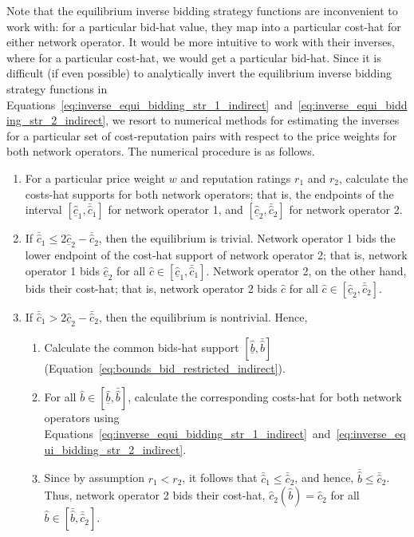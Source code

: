 Note that the equilibrium inverse bidding strategy functions are inconvenient to work with: for a particular bid-hat value, they map into a particular cost-hat for either network operator. It would be more intuitive to work with their inverses, where for a particular cost-hat, we would get a particular bid-hat. Since it is difficult (if even possible) to analytically invert the equilibrium inverse bidding strategy functions in Equations~\eqref{eq:inverse_equi_bidding_str_1_indirect}~and~\eqref{eq:inverse_equi_bidding_str_2_indirect}, we resort to numerical methods for estimating the inverses for a particular set of cost-reputation pairs with respect to the price weights for both network operators. The numerical procedure is as follows.
\begin{enumerate}
  \item For a particular price weight $w$ and reputation ratings $r_1$ and $r_2$, calculate the costs-hat supports for both network operators; that is, the endpoints of the interval $[\underline{\hat{c}}_1, \bar{\hat{c}}_1]$ for network operator 1, and $[\underline{\hat{c}}_2, \bar{\hat{c}}_2]$ for network operator 2.
  \item If $\bar{\hat{c}}_1 \le 2\underline{\hat{c}}_2 - \bar{\hat{c}}_2$, then the equilibrium is trivial. Network operator 1 bids the lower endpoint of the cost-hat support of network operator 2; that is, network operator 1 bids $\underline{\hat{c}}_2$ for all $\hat{c}\in [\underline{\hat{c}}_1, \bar{\hat{c}}_1]$. Network operator 2, on the other hand, bids their cost-hat; that is, network operator 2 bids $\hat{c}$ for all $\hat{c}\in [\underline{\hat{c}}_2, \bar{\hat{c}}_2]$.
  \item If $\bar{\hat{c}}_1 > 2\underline{\hat{c}}_2 - \bar{\hat{c}}_2$, then the equilibrium is nontrivial. Hence,
  \begin{enumerate}
    \item Calculate the common bids-hat support $[\underline{\hat{b}}, \bar{\hat{b}}]$ (Equation~\eqref{eq:bounds_bid_restricted_indirect}).
    \item For all $\hat{b}\in [\underline{\hat{b}}, \bar{\hat{b}}]$, calculate the corresponding costs-hat for both network operators using Equations~\eqref{eq:inverse_equi_bidding_str_1_indirect}~and~\eqref{eq:inverse_equi_bidding_str_2_indirect}.
    \item Since by assumption $r_1 < r_2$, it follows that $\bar{\hat{c}}_1 \le \bar{\hat{c}}_2$, and hence, $\bar{\hat{b}}\le \bar{\hat{c}}_2$. Thus, network operator 2 bids their cost-hat, $\hat{c}_2(\hat{b}) = \hat{c}_2$  for all $\hat{b}\in [\bar{\hat{b}}, \bar{\hat{c}}_2]$.
  \end{enumerate}
\end{enumerate}

